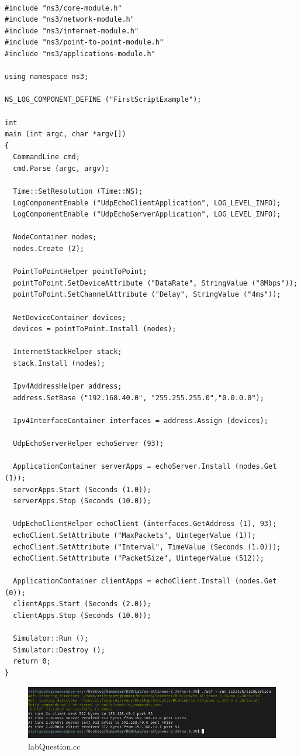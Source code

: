 \documentclass[fullpage]{article}
\begin{document}
\begin{verbatim}

#include "ns3/core-module.h"
#include "ns3/network-module.h"
#include "ns3/internet-module.h"
#include "ns3/point-to-point-module.h"
#include "ns3/applications-module.h"

using namespace ns3;

NS_LOG_COMPONENT_DEFINE ("FirstScriptExample");

int
main (int argc, char *argv[])
{
  CommandLine cmd;
  cmd.Parse (argc, argv);

  Time::SetResolution (Time::NS);
  LogComponentEnable ("UdpEchoClientApplication", LOG_LEVEL_INFO);
  LogComponentEnable ("UdpEchoServerApplication", LOG_LEVEL_INFO);

  NodeContainer nodes;
  nodes.Create (2);

  PointToPointHelper pointToPoint;
  pointToPoint.SetDeviceAttribute ("DataRate", StringValue ("8Mbps"));
  pointToPoint.SetChannelAttribute ("Delay", StringValue ("4ms"));

  NetDeviceContainer devices;
  devices = pointToPoint.Install (nodes);

  InternetStackHelper stack;
  stack.Install (nodes);

  Ipv4AddressHelper address;
  address.SetBase ("192.168.40.0", "255.255.255.0","0.0.0.0");

  Ipv4InterfaceContainer interfaces = address.Assign (devices);

  UdpEchoServerHelper echoServer (93);

  ApplicationContainer serverApps = echoServer.Install (nodes.Get (1));
  serverApps.Start (Seconds (1.0));
  serverApps.Stop (Seconds (10.0));

  UdpEchoClientHelper echoClient (interfaces.GetAddress (1), 93);
  echoClient.SetAttribute ("MaxPackets", UintegerValue (1));
  echoClient.SetAttribute ("Interval", TimeValue (Seconds (1.0)));
  echoClient.SetAttribute ("PacketSize", UintegerValue (512));

  ApplicationContainer clientApps = echoClient.Install (nodes.Get (0));
  clientApps.Start (Seconds (2.0));
  clientApps.Stop (Seconds (10.0));

  Simulator::Run ();
  Simulator::Destroy ();
  return 0;
}
\end{verbatim}

\begin{figure}[h!]
  \includegraphics[width=\linewidth]{labQuestion.png}
  \caption{labQuestion.cc}
  \label{fig:output2}
\end{figure}
\end{document}
